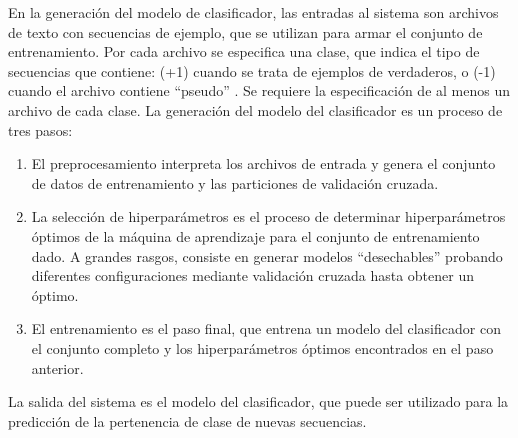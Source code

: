 En la generación del modelo de clasificador, las entradas al sistema
son archivos de texto con secuencias de ejemplo, que se utilizan para
armar el conjunto de entrenamiento.
Por cada archivo se especifica una clase, que indica el tipo de
secuencias que contiene:  (+1) cuando se trata de ejemplos
de  verdaderos, o  (-1) cuando el archivo
contiene ``pseudo'' .
Se requiere la especificación de al menos un archivo de cada clase.
La generación del modelo del clasificador es un proceso de tres pasos:
%
\begin{enumerate}
\item
  El preprocesamiento interpreta los archivos de entrada y
  genera el conjunto de datos de entrenamiento y las particiones de
  validación cruzada.
\item
  La selección de hiperparámetros es el proceso de determinar
  hiperparámetros óptimos de la máquina de aprendizaje para
  el conjunto de entrenamiento dado. A grandes rasgos, consiste en
  generar modelos ``desechables'' probando diferentes configuraciones
  mediante validación cruzada hasta obtener un óptimo.
\item
  El entrenamiento es el paso final, que entrena un modelo del
  clasificador con el conjunto completo y los hiperparámetros
  óptimos encontrados en el paso anterior.
\end{enumerate}
%
La salida del sistema es el modelo del clasificador, que
puede ser utilizado para la predicción de la pertenencia de clase de
nuevas secuencias.

